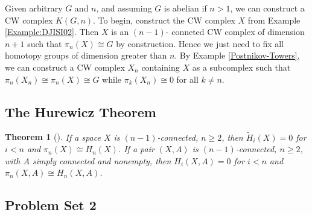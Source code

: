 \documentclass[reqno]{amsart}
\newtheorem{theorem}{Theorem}[section]
\theoremstyle{definition}
\theoremstyle{remark}
\begin{document}
Given arbitrary $G$ and $n$, and assuming $G$ is abelian
if $n>1$, we can construct a CW complex
$K(G,n)$. To begin, construct the
CW complex $X$ from Example \ref{Example:DJISI02}. Then
$X$ is an $(n-1) $- conneted CW complex of dimension
$n+1$ such that $\pi_n (X) \cong G$ by construction. Hence
we just need to fix all homotopy groups of dimension
greater than $n$. By
Example \ref{Postnikov-Towers}, we can
construct a CW complex $X_n$ containing $X$ as a subcomplex
such that
$\pi_n (X_n) \cong \pi_n (X) \cong G$ while
$\pi_k(X_n) \cong 0$ for all $k \neq  n$.




\subsection{The Hurewicz Theorem}

\begin{theorem}[]
    If a space $X$ is $(n-1)$-connected, $n\ge 2$,
    then $\tilde{H}_i (X) = 0$ for 
    $i < n$ and $\pi_n (X) \cong
    H_n (X)$. If a pair $(X,A)$ is $(n-1)$-connected,
    $n \ge 2$, with $A$ simply connected
    and nonempty, then $H_i (X,A) = 0$ for
    $i < n$ and $\pi_n (X,A) \cong
    H_n (X,A)$.
\end{theorem}




\subsection{Problem Set 2}






\newpage

\printbibliography
\end{document}
